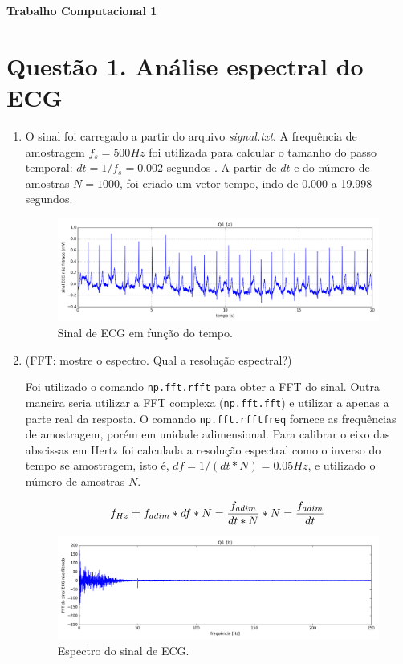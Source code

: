 \documentclass[12pt,letterpaper]{article}
\newcommand\hwnumber{1}
\begin{document}
\centerline{\textbf{\Large Trabalho Computacional \hwnumber}}

\centerline{}

\section*{Questão 1. Análise espectral do ECG}
\begin{enumerate}[label=(\alph*)]  %
    \item O sinal foi carregado a partir do arquivo \emph{signal.txt}. A frequência de amostragem ${f_s = 500 Hz}$ foi utilizada para calcular o tamanho do passo temporal: ${dt = 1/f_s = 0.002}$ segundos . A partir de ${dt}$ e do número de amostras ${N = 1000}$, foi criado um vetor tempo, indo de 0.000 a 19.998 segundos.
        \begin{figure}[H]
            \centering
            \includegraphics[width=15cm]{images/Q1_a_sinal_nfilt.png}
            \caption{Sinal de ECG em função do tempo.}
            \label{fig:1}
        \end{figure}

    \item (FFT: mostre o espectro. Qual a resolução espectral?)
    
    Foi utilizado o comando \lstinline{np.fft.rfft} para obter a FFT do sinal. Outra maneira seria utilizar a FFT complexa (\lstinline{np.fft.fft}) e utilizar a apenas a parte real da resposta. O comando \lstinline{np.fft.rfftfreq} fornece as frequências de amostragem, porém em unidade adimensional. Para calibrar o eixo das abscissas em Hertz foi calculada a resolução espectral como o inverso do tempo se amostragem, isto é, ${df = {1/(dt*N)} = 0.05 Hz}$, e utilizado o número de amostras $N$.
    
    $${f_{Hz} = f_{adim}*df*N = {f_{adim} \over {dt*N}} *N = {f_{adim} \over dt}}$$
    
        \begin{figure}[H]
            \centering
            \includegraphics[width=15cm]{images/Q1_b_espectro_nfilt.png}
            \caption{Espectro do sinal de ECG.}
            \label{fig:2}
        \end{figure}
        

\end{enumerate}
\end{document}
